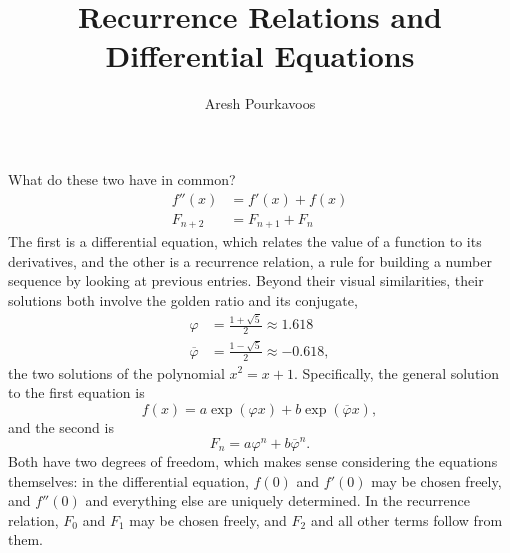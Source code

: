 \documentclass{article}
\begin{document}
\title{Recurrence Relations and Differential Equations}
\author{Aresh Pourkavoos}
\maketitle

What do these two have in common?
\begin{align*}
  f''(x) &= f'(x)+f(x) \\
  F_{n+2} &= F_{n+1}+F_n
\end{align*}
The first is a differential equation,
which relates the value of a function to its derivatives,
and the other is a recurrence relation,
a rule for building a number sequence by looking at previous entries.
Beyond their visual similarities,
their solutions both involve the golden ratio and its conjugate,
\begin{align*}
  \varphi &= \frac{1+\sqrt{5}}{2} \approx 1.618 \\
  \overline{\varphi} &= \frac{1-\sqrt{5}}{2} \approx -0.618,
\end{align*}
the two solutions of the polynomial
$x^2=x+1$.
Specifically, the general solution to the first equation is
\[f(x) = a\exp(\varphi x)+b\exp(\overline{\varphi}x),\]
and the second is
\[F_n = a\varphi^n+b\overline{\varphi}^n.\]
Both have two degrees of freedom,
which makes sense considering the equations themselves:
in the differential equation,
$f(0)$ and $f'(0)$ may be chosen freely,
and $f''(0)$ and everything else are uniquely determined.
In the recurrence relation,
$F_0$ and $F_1$ may be chosen freely,
and $F_2$ and all other terms follow from them.



\end{document}
